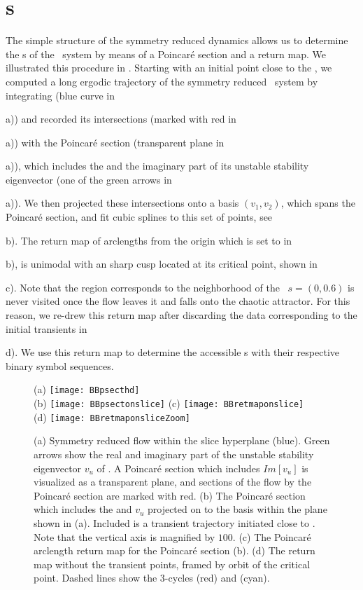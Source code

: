 \section{\Po s}
\label{s:numerics}

The simple structure of the symmetry reduced dynamics allows us to
determine the \rpo s of the \twomode\ system by means of a Poincar\'e
section and a return map. We illustrated this procedure in
. Starting with an initial point close to the
\REQV{}{}, we computed a long ergodic trajectory of the symmetry reduced
\twomode\ system by integrating  (blue curve in
\,{a)) and recorded its intersections (marked
with red in \,{a)) with the Poincar\'e section
(transparent plane in \,{a)), which includes
the \REQV{}{} and the imaginary part of its unstable stability
eigenvector (one of the green arrows in \,{a)).
We then projected these intersections onto a basis $(v_1, v_2)$, which
spans the Poincar\'e section, and fit cubic splines to this set of
points, see \,{b). The return map of arclengths
from the origin which is set to \REQV{}{} in
\,{b), is unimodal with an sharp cusp located at its critical point, shown
in \,{c). Note that the region corresponds to
the neighborhood of the \reqv\ $s = (0, 0.6)$ is never visited once the
flow leaves it and falls onto the chaotic attractor. For this reason, we
re-drew this return map after discarding the data corresponding to the
initial transients in \,{d). We use this return
map to determine the accessible \rpo s  with their respective binary
symbol sequences.

\begin{figure}
\centering
  (a) \texttt{[image: BBpsecthd]} \\
  (b) \texttt{[image: BBpsectonslice]}
  (c) \texttt{[image: BBretmaponslice]} \\
  (d) \texttt{[image: BBretmaponsliceZoom]}
\caption{(a) Symmetry reduced flow within the slice hyperplane (blue).
			Green arrows show the real and imaginary part of the unstable stability
			eigenvector $v_u$ of \REQV{}{}. A Poincar\'e section which includes
			$Im[v_u]$ is visualized as a transparent plane, and sections
			of the flow by the Poincar\'e section are marked with red.
		 (b) The Poincar\'e section which includes the \REQV{}{} and $v_u$ projected
			on to the basis within the plane shown in (a). Included is a
            transient trajectory initiated close to \REQV{}{}. Note that
		  	the vertical axis is magnified by $100$.
		 (c) The Poincar\'e arclength return map for the
		    Poincar\'e section (b).
		 (d) The return map without the transient points, framed by
            orbit of the critical point.
		 	Dashed lines show the 3-cycles  (red) and  (cyan).
}
\label{fig:psectandretmap}
\end{figure}

}}}}}}}}
